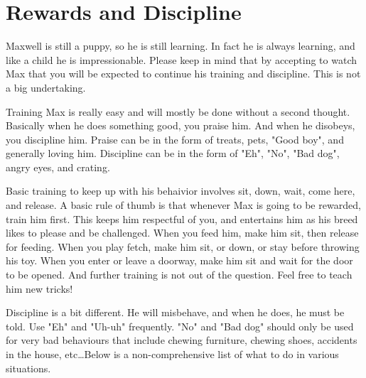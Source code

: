 \documentclass[pdftex,12pt]{article}
\begin{document}
\newpage
\section{Rewards and Discipline}

Maxwell is still a puppy, so he is still learning. In fact he is always
learning, and like a child he is impressionable. Please keep in mind that by
accepting to watch Max that you will be expected to continue his training and
discipline.  This is not a big undertaking. 

\bigskip

Training Max is really easy and will mostly be done without a second thought.
Basically when he does something good, you praise him. And when he disobeys, you
discipline him. Praise can be in the form of treats, pets, "Good boy", and
generally loving him. Discipline can be in the form of "Eh", "No", "Bad dog",
angry eyes, and crating. 

\bigskip

Basic training to keep up with his behaivior involves sit, down, wait, come
here, and release. A basic rule of thumb is that whenever Max is going to be
rewarded, train him first. This keeps him respectful of you, and entertains him
as his breed likes to please and be challenged. When you feed him, make him sit,
then release for feeding. When you play fetch, make him sit, or down, or stay
before throwing his toy. When you enter or leave a doorway, make him sit and
wait for the door to be opened. And further training is not out of the question.
Feel free to teach him new tricks!

\bigskip

Discipline is a bit different. He will misbehave, and when he does, he must be
told. Use "Eh" and "Uh-uh" frequently. "No" and "Bad dog" should only be used
for very bad behaviours that include chewing furniture, chewing shoes, accidents
in the house, etc\ldots Below is a non-comprehensive list of what to do in
various situations.
\end{document}
